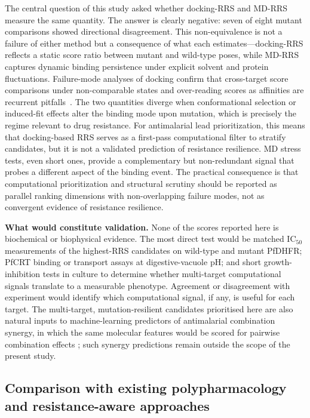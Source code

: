 \documentclass[journal=jcisd8,manuscript=article,layout=traditional]{achemso}
\begin{document}
The central question of this study asked whether docking-RRS and MD-RRS measure the same quantity. The answer is clearly negative: seven of eight mutant comparisons showed directional disagreement. This non-equivalence is not a failure of either method but a consequence of what each estimates---docking-RRS reflects a static score ratio between mutant and wild-type poses, while MD-RRS captures dynamic binding persistence under explicit solvent and protein fluctuations. Failure-mode analyses of docking confirm that cross-target score comparisons under non-comparable states and over-reading scores as affinities are recurrent pitfalls~\citep{kittelson2026docking}. The two quantities diverge when conformational selection or induced-fit effects alter the binding mode upon mutation, which is precisely the regime relevant to drug resistance. For antimalarial lead prioritization, this means that docking-based RRS serves as a first-pass computational filter to stratify candidates, but it is not a validated prediction of resistance resilience. MD stress tests, even short ones, provide a complementary but non-redundant signal that probes a different aspect of the binding event. The practical consequence is that computational prioritization and structural scrutiny should be reported as parallel ranking dimensions with non-overlapping failure modes, not as convergent evidence of resistance resilience.

\textbf{What would constitute validation.}
None of the scores reported here is biochemical or biophysical evidence. The most direct test would be matched IC$_{50}$ measurements of the highest-RRS candidates on wild-type and mutant PfDHFR; PfCRT binding or transport assays at digestive-vacuole pH; and short growth-inhibition tests in culture to determine whether multi-target computational signals translate to a measurable phenotype. Agreement or disagreement with experiment would identify which computational signal, if any, is useful for each target. The multi-target, mutation-resilient candidates prioritised here are also natural inputs to machine-learning predictors of antimalarial combination synergy, in which the same molecular features would be scored for pairwise combination effects \citep{mlsypredc2024}; such synergy predictions remain outside the scope of the present study.

\subsection{Comparison with existing polypharmacology and resistance-aware approaches}
\end{document}
